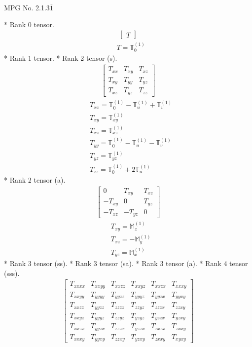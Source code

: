 \documentclass[fleqn,8pt,landscape]{jsarticle}
\begin{document}
\setcounter{MaxMatrixCols}{32}

\renewcommand{\tablename}{Table~}
\renewcommand{\figurename}{Figure~}
\begin{center}
\LARGE
MPG No. 2.1.3\quad$\bar{1}$
\end{center}
* Rank 0 tensor.
\begin{align*}
\begin{bmatrix} T \end{bmatrix}
\end{align*}
\begin{align*}
& T = \mathbb{T}_{0}^{(1)}
\end{align*}
* Rank 1 tensor.
* Rank 2 tensor (s).
\begin{align*}
\begin{bmatrix} T_{xx} & T_{xy} & T_{xz} \\ T_{xy} & T_{yy} & T_{yz} \\ T_{xz} & T_{yz} & T_{zz} \end{bmatrix}
\end{align*}
\begin{align*}
& T_{xx} = \mathbb{T}_{0}^{(1)} - \mathbb{T}_{u}^{(1)} + \mathbb{T}_{v}^{(1)} \\
& T_{xy} = \mathbb{T}_{xy}^{(1)} \\
& T_{xz} = \mathbb{T}_{xz}^{(1)} \\
& T_{yy} = \mathbb{T}_{0}^{(1)} - \mathbb{T}_{u}^{(1)} - \mathbb{T}_{v}^{(1)} \\
& T_{yz} = \mathbb{T}_{yz}^{(1)} \\
& T_{zz} = \mathbb{T}_{0}^{(1)} + 2 \mathbb{T}_{u}^{(1)}
\end{align*}
* Rank 2 tensor (a).
\begin{align*}
\begin{bmatrix} 0 & T_{xy} & T_{xz} \\ - T_{xy} & 0 & T_{yz} \\ - T_{xz} & - T_{yz} & 0 \end{bmatrix}
\end{align*}
\begin{align*}
& T_{xy} = \mathbb{M}_{z}^{(1)} \\
& T_{xz} = - \mathbb{M}_{y}^{(1)} \\
& T_{yz} = \mathbb{M}_{x}^{(1)}
\end{align*}
* Rank 3 tensor (ss).
* Rank 3 tensor (sa).
* Rank 3 tensor (a).
* Rank 4 tensor (sss).
\begin{align*}
\begin{bmatrix} T_{xxxx} & T_{xxyy} & T_{xxzz} & T_{xxyz} & T_{xxzx} & T_{xxxy} \\ T_{xxyy} & T_{yyyy} & T_{yyzz} & T_{yyyz} & T_{yyzx} & T_{yyxy} \\ T_{xxzz} & T_{yyzz} & T_{zzzz} & T_{zzyz} & T_{zzzx} & T_{zzxy} \\ T_{xxyz} & T_{yyyz} & T_{zzyz} & T_{yzyz} & T_{yzzx} & T_{yzxy} \\ T_{xxzx} & T_{yyzx} & T_{zzzx} & T_{yzzx} & T_{zxzx} & T_{zxxy} \\ T_{xxxy} & T_{yyxy} & T_{zzxy} & T_{yzxy} & T_{zxxy} & T_{xyxy} \end{bmatrix}
\end{align*}
\end{document}
